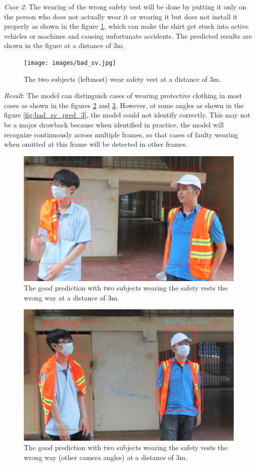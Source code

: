 \documentclass[conference]{IEEEtran}
\begin{document}
\emph{Case 2}: The wearing of the wrong safety vest will be done by putting it only on the person who does not actually wear it or wearing it but does not install it properly as shown in the figure \ref{fig:bad_sv}, which can make the shirt get stuck into active vehicles or machines and causing unfortunate accidents. The predicted results are shown in the figure at a distance of $ 3 $m.
\begin{figure}[ht]
	\centerline{\texttt{[image: images/bad\_sv.jpg]}}
  	\caption{The two subjects (leftmost) wear safety vest at a distance of 3m.}
  	\label{fig:bad_sv}
\end{figure}
\emph{Result}: The model can distinguish cases of wearing protective clothing in most cases as shown in the figures \ref{fig:bad_sv_pred_1} and \ref{fig:bad_sv_pred_2}. However, at some angles as shown in the figure \ref{fig:bad_sv_pred_3}, the model could not identify correctly. This may not be a major drawback because when identified in practice, the model will recognize continuously across multiple frames, so that cases of faulty wearing when omitted at this frame will be detected in other frames.
\begin{figure}[ht]
	\centerline{\includegraphics[scale=0.1]{images/bad_sv_predict_2.jpg}}
  	\caption{The good prediction with two subjects wearing the safety vests the wrong way at a distance of 3m.}
  	\label{fig:bad_sv_pred_1}
\end{figure}
\begin{figure}[ht]
	\centerline{\includegraphics[scale=0.21]{images/bad_sv_predict_3.jpg}}
  	\caption{The good prediction with two subjects wearing the safety vests the wrong way (other camera angles) at a distance of 3m.}
  	\label{fig:bad_sv_pred_2}
\end{figure}
\end{document}
